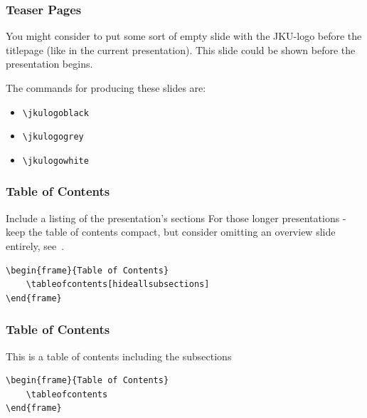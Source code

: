 \documentclass[aspectratio=169]{beamer}
\begin{document}

\begin{frame}
\frametitle{Teaser Pages}

 You might consider to put some sort of empty slide with the JKU-logo before the titlepage (like in the current presentation). This slide could be shown before the presentation begins.

 The commands for producing these slides are:
 \begin{itemize}
  \item \texttt{\textbackslash{}jkulogoblack}
  \item \texttt{\textbackslash{}jkulogogrey}
  \item \texttt{\textbackslash{}jkulogowhite}
 \end{itemize}
\end{frame}



\begin{frame}[containsverbatim]
\frametitle{Table of Contents}

Include a listing of the presentation's sections
For those longer presentations - keep the table of contents compact, but consider omitting an overview slide entirely, see~\cite{karol}. 
\begin{verbatim}
\begin{frame}{Table of Contents}
    \tableofcontents[hideallsubsections]
\end{frame}
\end{verbatim}
\tableofcontents[hideallsubsections]

\end{frame}

\begin{frame}[containsverbatim]
\frametitle{Table of Contents}

This is a table of contents including the subsections

\begin{verbatim}
\begin{frame}{Table of Contents}
    \tableofcontents
\end{frame}
\end{verbatim}
\tableofcontents
\end{frame}
\end{document}
